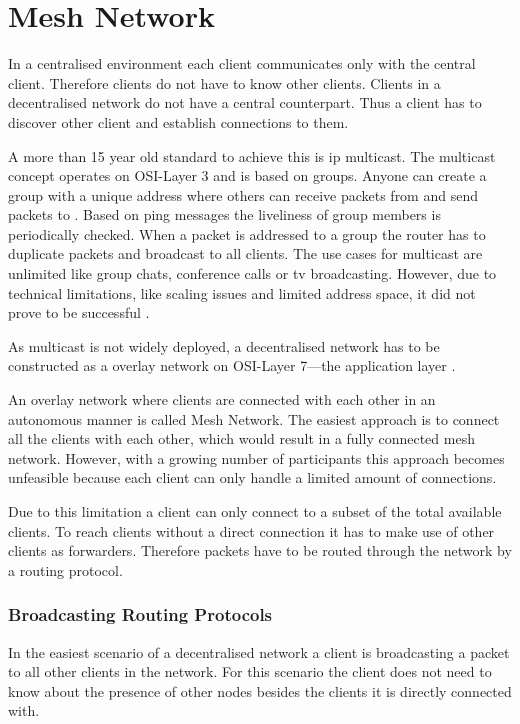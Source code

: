 \section{Mesh Network}
\label{chap:mesh-network}
In a centralised environment each client communicates only with the central client. Therefore clients do not have to know other clients.
Clients in a decentralised network do not have a central counterpart. Thus a client has to discover other client and establish connections to them.

A more than 15 year old standard to achieve this is \gls{ip} multicast. The multicast concept operates on OSI-Layer 3 and is based on groups. Anyone can create a group with a unique address where others can receive packets from and send packets to \cite[pp. 484-485]{tanenbaum_wetherall_2011}. Based on ping messages the liveliness of group members is periodically checked. When a packet is addressed to a group the router has to duplicate packets and broadcast to all clients. 
The use cases for multicast are unlimited like group chats, conference calls or tv broadcasting.
However, due to technical limitations, like scaling issues and limited address space, it did not prove to be successful \cite{multicast}.

As multicast is not widely deployed, a decentralised network has to be constructed as a overlay network on OSI-Layer 7—the application layer \cite[\S1]{multicast-problems}.

An overlay network where clients are connected with each other in an autonomous manner is called Mesh Network. The easiest approach is to connect all the clients with each other, which would result in a fully connected mesh network. However, with a growing number of participants this approach becomes unfeasible because each client can only handle a limited amount of connections.

Due to this limitation a client can only connect to a subset of the total available clients. To reach clients without a direct connection it has to make use of other clients as forwarders. Therefore packets have to be routed through the network by a routing protocol.

\subsubsection{Broadcasting Routing Protocols}
In the easiest scenario of a decentralised network a client is broadcasting a packet to all other clients in the network. For this scenario the client does not need to know about the presence of other nodes besides the clients it is directly connected with.

